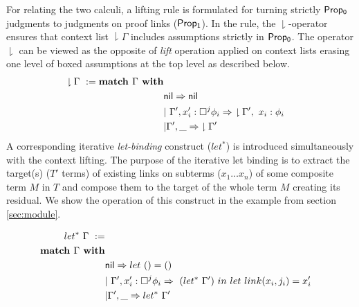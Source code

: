 %
For relating the two calculi, a lifting rule is formulated for turning strictly ${\sf Prop_0}$ judgments to judgments on proof links (${\sf Prop_1}$). In the rule,  the $\downharpoonright$-operator ensures that  context list $\downharpoonright\Gamma$ includes assumptions strictly in ${\sf Prop_0}$. 
The operator $\downharpoonright$ can be viewed as the opposite of \textit{lift} operation applied on context lists  erasing one level of boxed assumptions at the top level as described below.
 \begin{align}
\nonumber \downharpoonright\Gamma\  :=\textbf{match $\Gamma $\ with} \\
&\nonumber   {\sf nil} \Rightarrow {\sf  nil}\\
&\nonumber|\ \Gamma', x_i^{\prime}:\Box^{j} \phi_i\Rightarrow\ \downharpoonright \Gamma' ,\  x_i:\phi_i\\
&\nonumber|{\Gamma',\_}\Rightarrow {\downharpoonright\Gamma'} 
\end{align}
A corresponding iterative \textit{let-binding} construct ($let^{*}$) is introduced simultaneously with the context lifting. The purpose of the iterative let binding is to extract the target(s) ($T'$ terms) of existing links on subterms ($x_1\ldots x_n$) of some composite term $M$ in $T$ and compose them to the target of the whole term $M$ creating its residual. We show the operation of this construct in the example from section \ref{sec:module}.
 
\begin{align}
\nonumber let^{*}\ \Gamma\  :=\\ 
\nonumber\textbf{match $\Gamma $\ with} \\
&\nonumber   {\sf nil} \Rightarrow {let\  ()= ()}\\
&\nonumber|\ \Gamma', x_i^{\prime}:\Box^{j} \phi_i\Rightarrow\ (let^{*}\ \Gamma')  \ in\  let \ link  (x_i,j_i)=x_i^{\prime}\\
&\nonumber|{\Gamma',\_}\Rightarrow {let^{*}\ \Gamma'} 
\end{align}

